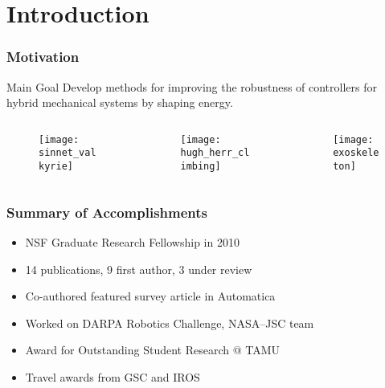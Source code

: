 \section{Introduction}
\showtoc


\begin{frame}[t]
  \frametitle{Motivation}
  \begin{block}{Main Goal}
    Develop methods for improving the robustness of controllers for hybrid
    mechanical systems by shaping energy.
  \end{block}
    \begin{columns}
    \begin{column}{.333\textwidth}
      \begin{figure}
        \centering
        \texttt{[image: sinnet\_valkyrie]}
      \end{figure}
    \end{column}
    \begin{column}{.333\textwidth}
      \begin{figure}
        \centering
        \texttt{[image: hugh\_herr\_climbing]}
      \end{figure}
    \end{column}
    \begin{column}{.333\textwidth}
      \begin{figure}
        \centering
        \texttt{[image: exoskeleton]}
      \end{figure}
    \end{column}
  \end{columns}
\end{frame}

\begin{frame}[t]
  \frametitle{Summary of Accomplishments}
  \begin{itemize}
  \item NSF Graduate Research Fellowship in 2010
  \item 14 publications, 9 first author, 3 under review
  \item Co-authored featured survey article in Automatica
  \item Worked on DARPA Robotics Challenge, NASA--JSC team
  \item Award for Outstanding Student Research @ TAMU
  \item Travel awards from GSC and IROS
  \end{itemize}
\end{frame}
